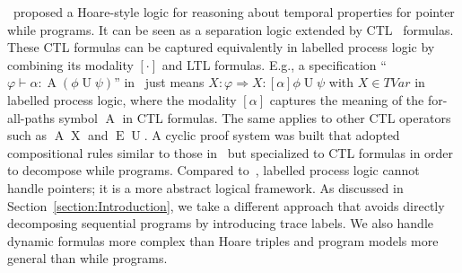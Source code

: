 \documentclass[manuscript,screen]{acmart}
\newcommand{\TVar}[0]{\textit{TVar}}
\DeclareMathOperator{\unt}{U}
\DeclareMathOperator{\all}{A}
\DeclareMathOperator{\ext}{E}
\DeclareMathOperator{\nt}{X}
\begin{document}

\cite{Gadi20}~proposed a Hoare-style logic for reasoning about temporal properties for pointer while programs. It can be seen as a separation logic extended by CTL~\cite{ClarkeEmerson81} formulas.  
These CTL formulas can be captured equivalently in labelled process logic by combining its modality $[\cdot]$ and LTL formulas. 
E.g., a specification ``$\varphi\vdash \alpha : \all(\phi \unt \psi)$'' in~\cite{Gadi20} just means $X : \varphi\Rightarrow X : [\alpha]\phi\unt \psi$ with $X\in \TVar$ in labelled process logic,  
where the modality $[\alpha]$ captures the meaning of the for-all-paths symbol $\all$ in CTL formulas. The same applies to other CTL operators such as $\all \nt$ and $\ext \unt$. 
A cyclic proof system was built that adopted compositional rules similar to those in~\cite{Beckert13} but specialized to CTL formulas in order to decompose while programs. 
Compared to~\cite{Gadi20}, labelled process logic cannot handle pointers; it is a more abstract logical framework. 
As discussed in Section~\ref{section:Introduction}, we take a different approach that avoids directly decomposing sequential programs by introducing trace labels. 
We also handle dynamic formulas more complex than Hoare triples and program models more general than while programs. 
\end{document}
